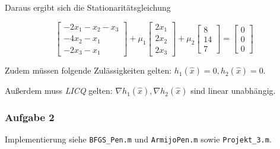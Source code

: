 \documentclass[a4paper, 12pt]{report}
\begin{document}
Daraus ergibt sich die Stationaritätsgleichung

$$\begin{bmatrix}-2x_1 - x_2 - x_3\\-4x_2 - x_1\\-2x_3-x_1\end{bmatrix} + \mu_1 \begin{bmatrix}2x_1\\2x_2\\2x_3\end{bmatrix} + \mu_2 \begin{bmatrix}8\\14\\7\end{bmatrix} = \begin{bmatrix}0\\0\\0\end{bmatrix}$$

Zudem müssen folgende Zulässigkeiten gelten: $h_1(\hat{x}) = 0, h_2(\hat{x}) = 0$.

Außerdem muss \textit{LICQ} gelten: $\nabla h_1(\hat{x}), \nabla h_2(\hat{x})$ sind linear unabhängig.

\subsubsection{Aufgabe 2}
Implementierung siehe \lstinline[basicstyle=\ttfamily\color{black}]|BFGS_Pen.m| und
\lstinline[basicstyle=\ttfamily\color{black}]|ArmijoPen.m| sowie \lstinline[basicstyle=\ttfamily\color{black}]|Projekt_3.m|.
\end{document}
